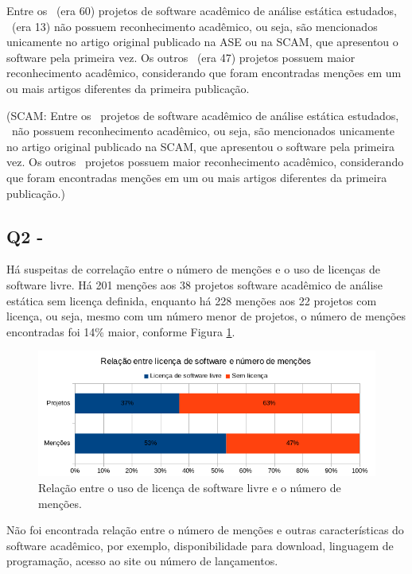 Entre os \SoftwareCount \ (era 60) projetos de software acadêmico de análise estática estudados, 
\SoftwareNotMentionedCount \ (era 13) não possuem reconhecimento acadêmico, ou seja, são
mencionados unicamente no artigo original publicado na ASE ou na SCAM,
que apresentou o software pela primeira vez. 
Os outros \MentionsStudyDois \ (era 47) projetos possuem maior reconhecimento acadêmico, 
considerando que foram encontradas menções em um ou mais artigos
diferentes da primeira publicação.

(SCAM: Entre os \SoftwareSCAMCount \ projetos de software acadêmico de análise estática estudados, 
\SoftwareNotMentionedSCAMCount \ não possuem reconhecimento acadêmico, ou seja, são
mencionados unicamente no artigo original publicado na SCAM,
que apresentou o software pela primeira vez. 
Os outros \MentionsStudyDoisSCAM \ projetos possuem maior reconhecimento acadêmico, 
considerando que foram encontradas menções em um ou mais artigos
diferentes da primeira publicação.)

\subsection{Q2 - \QuestaoDois} %

Há suspeitas de correlação entre o número de menções e o uso de licenças de
software livre. 
Há 201 menções aos 38 projetos software acadêmico de análise estática sem licença definida, 
enquanto há 228 menções aos 22 projetos com licença, ou seja, 
mesmo com um número menor de projetos, o número de menções encontradas foi 14\% maior, 
conforme Figura \ref{license-vs-mentions}.

\begin{figure}[ht]
  \center
  \includegraphics[scale=0.6]{imagens/license-vs-mentions.png}
  \caption{Relação entre o uso de licença de software livre e o número de menções.}
  \label{license-vs-mentions}
\end{figure}

Não foi encontrada relação entre o número de menções e 
outras características do software acadêmico, por exemplo,
disponibilidade para download, linguagem de programação, acesso ao site ou número
de lançamentos.

